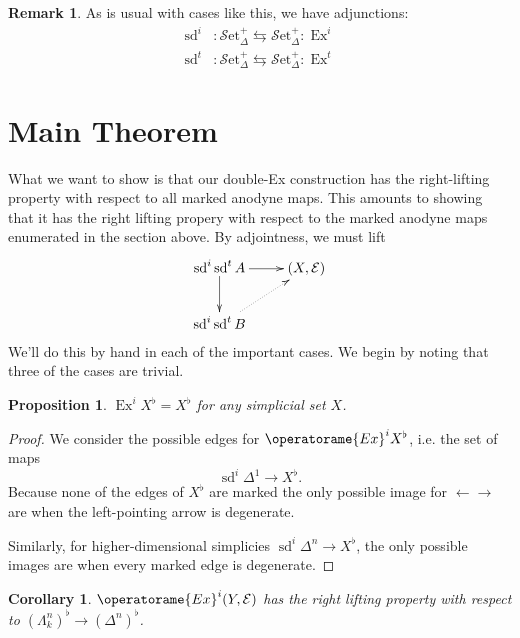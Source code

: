 \documentclass[english]{amsart}
\newcommand{\mc}{\mathcal}
\newcommand{\sset}{\mc{S}\text{et}_\Delta}
\newcommand{\Ex}{\operatorame{Ex}}
\newcommand{\sd}{\operatorname{sd}}
\newtheorem*{cor}{Corollary}
\newtheorem*{prop}{Proposition}
\theoremstyle{definition}
\newtheorem*{rmk}{Remark}
\begin{document}
\begin{rmk}
As is usual with cases like this, we have adjunctions:
\begin{align*}
\operatorname{sd}^i &: \sset^+ \leftrightarrows \sset^+ : \operatorname{Ex}^i\\
\operatorname{sd}^t & : \sset^+ \leftrightarrows \sset^+ : \operatorname{Ex}^t
\end{align*}
\end{rmk}









\section{Main Theorem}

What we want to show is that our double-Ex construction has the right-lifting property with respect to all marked anodyne maps. This amounts to showing that it has the right lifting propery with respect to the marked anodyne maps enumerated in the section above. By adjointness, we must lift
\[
\xymatrix{
\operatorname{sd}^i \operatorname{sd}^t A \ar[r]\ar[d] & (X,\mc{E})\\
\operatorname{sd}^i \operatorname{sd}^t B \ar@{.>}[ur] & 
}
\]
We'll do this by hand in each of the important cases. We begin by noting that three of the cases are trivial. 

\begin{prop}
$\operatorname{Ex}^i X^\flat = X^\flat$ for any simplicial set $X$. 
\end{prop}
\begin{proof}
We consider the possible edges for $\Ex^i X^\flat$, i.e. the set of maps
\[
\sd^i \Delta^1 \to X^\flat. 
\]
Because none of the edges of $X^\flat$ are marked the only possible image for $\leftarrow \rightarrow$ are when the left-pointing arrow is degenerate. 

Similarly, for higher-dimensional simplicies $\sd^i \Delta^n \to X^\flat$, the only possible images are when every marked edge is degenerate. 
\end{proof}

\begin{cor}
$\Ex^i (Y,\mc{E})$ has the right lifting property with respect to $(\Lambda^n_k)^\flat \to (\Delta^n)^\flat$. 
\end{cor}
\end{document}
